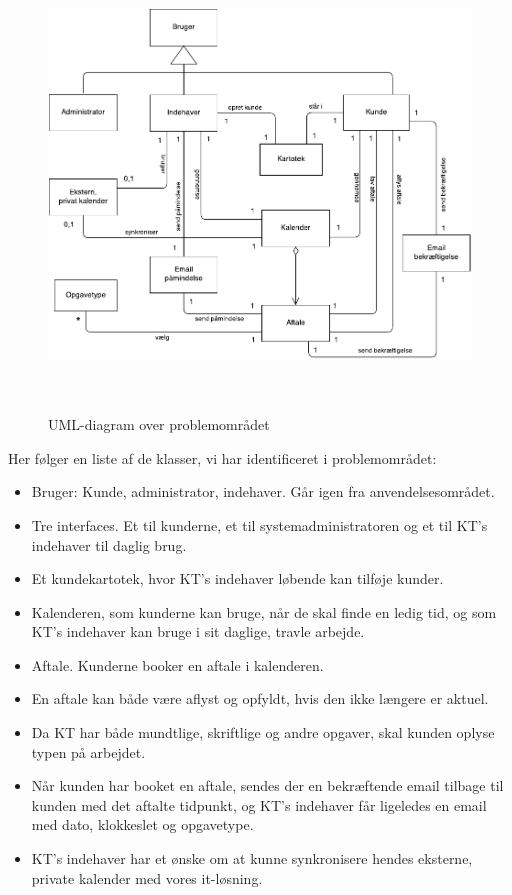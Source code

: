\documentclass[12pt]{article}   %
\begin{document}
\begin{figure}[!ht]
\begin{center}
\includegraphics[width=12cm, height=12cm]{problemomr.pdf}
\caption{UML-diagram over problemområdet}
\label{fig:problem}
\end{center}
\end{figure}

Her følger en liste af de klasser, vi har identificeret i problemområdet:

\begin{itemize}
\item Bruger: Kunde, administrator, indehaver. Går igen fra
	anvendelsesområdet.
\item Tre interfaces. Et til kunderne, et til systemadministratoren og et til
	KT's indehaver til daglig brug.
\item Et kundekartotek, hvor KT's indehaver løbende kan tilføje kunder.
\item Kalenderen, som kunderne kan bruge, når de skal finde en ledig tid, og
	som KT's indehaver kan bruge i sit daglige, travle arbejde.
\item Aftale. Kunderne booker en aftale i kalenderen.
\item En aftale kan både være aflyst og opfyldt, hvis den ikke længere er
	aktuel.
\item Da KT har både mundtlige, skriftlige og andre opgaver, skal kunden
	oplyse typen på arbejdet.
\item Når kunden har booket en aftale, sendes der en bekræftende email tilbage
	til kunden med det aftalte tidpunkt, og KT's indehaver får ligeledes
	en email med dato, klokkeslet og opgavetype.  
\item KT's indehaver har et ønske om at kunne synkronisere hendes eksterne,
	private kalender med vores it-løsning.
\end{itemize}
\end{document}
